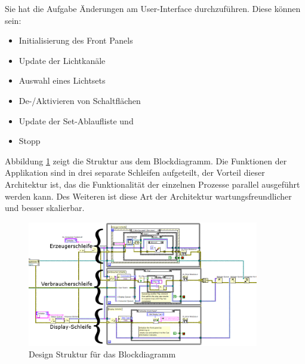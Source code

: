 Sie hat die Aufgabe Änderungen am User-Interface durchzuführen. Diese können sein:
\begin{itemize}
\item Initialisierung des Front Panels
\item Update der Lichtkanäle
\item Auswahl eines Lichtsets
\item De-/Aktivieren von Schaltflächen
\item Update der Set-Ablaufliste und
\item Stopp
\end{itemize}

Abbildung \ref{fig:schleifen} zeigt die Struktur aus dem Blockdiagramm. 
Die Funktionen der Applikation sind in drei separate Schleifen aufgeteilt, der Vorteil dieser Architektur ist, das die Funktionalität der einzelnen Prozesse parallel ausgeführt werden kann. Des Weiteren ist diese Art der Architektur wartungsfreundlicher und besser skalierbar. 


	\begin{figure}%
	\centering
		\includegraphics[width=0.9\textwidth]{Pics/ueberblick003.png}
	\caption{Design Struktur für das Blockdiagramm}
	\label{fig:schleifen}
	\end{figure}
 		

		
		


